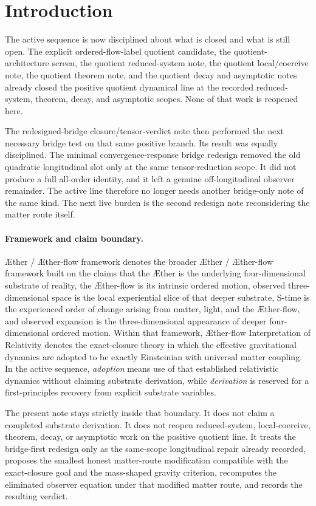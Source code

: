 \documentclass[11pt]{article}
\newcommand{\Aether}{\AE{}ther}
\newcommand{\Aflow}{\AE{}ther-flow}
\newcommand{\TheoryName}{\Aflow{} Interpretation of Relativity}
\newcommand{\TheoryProgram}{\Aether{} / \Aflow{} framework}
\begin{document}
\section{Introduction}

The active sequence is now disciplined about what is closed and what is still open. The explicit ordered-flow-label quotient candidate, the quotient-architecture screen, the quotient reduced-system note, the quotient local/coercive note, the quotient theorem note, and the quotient decay and asymptotic notes already closed the positive quotient dynamical line at the recorded reduced-system, theorem, decay, and asymptotic scopes. None of that work is reopened here.

The redesigned-bridge closure/tensor-verdict note then performed the next necessary bridge test on that same positive branch. Its result was equally disciplined. The minimal convergence-response bridge redesign removed the old quadratic longitudinal slot only at the same tensor-reduction scope. It did not produce a full all-order identity, and it left a genuine off-longitudinal observer remainder. The active line therefore no longer needs another bridge-only note of the same kind. The next live burden is the second redesign note reconsidering the matter route itself.

\paragraph{Framework and claim boundary.}
\TheoryProgram{} denotes the broader \Aether{} / \Aflow{} framework built on the claims that the \Aether{} is the underlying four-dimensional substrate of reality, the \Aflow{} is its intrinsic ordered motion, observed three-dimensional space is the local experiential slice of that deeper substrate, S-time is the experienced order of change arising from matter, light, and the \Aflow{}, and observed expansion is the three-dimensional appearance of deeper four-dimensional ordered motion. Within that framework, \TheoryName{} denotes the exact-closure theory in which the effective gravitational dynamics are adopted to be exactly Einsteinian with universal matter coupling. In the active sequence, \emph{adoption} means use of that established relativistic dynamics without claiming substrate derivation, while \emph{derivation} is reserved for a first-principles recovery from explicit substrate variables.

The present note stays strictly inside that boundary. It does not claim a completed substrate derivation. It does not reopen reduced-system, local-coercive, theorem, decay, or asymptotic work on the positive quotient line. It treats the bridge-first redesign only as the same-scope longitudinal repair already recorded, proposes the smallest honest matter-route modification compatible with the exact-closure goal and the mass-shaped gravity criterion, recomputes the eliminated observer equation under that modified matter route, and records the resulting verdict.
\end{document}
